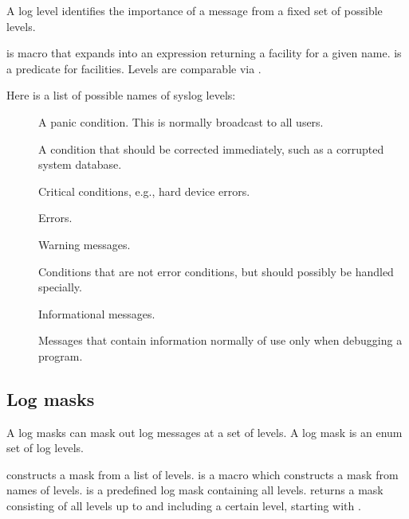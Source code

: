 A log level identifies the importance of a message from a fixed set
of possible levels.

\begin{protos}
\end{protos}
\noindent
{} is macro that expands into an expression returning
a facility for a given name.   is a predicate for
facilities.  Levels are comparable via .

Here is a list of possible names of syslog levels:

\begin{description}
\item[]
  A panic condition.  This is normally broadcast to all users.

\item[]
  A condition that should be corrected immediately, such as a
  corrupted system database.

\item[]
  Critical conditions, e.g., hard device errors.

\item[]
  Errors.

\item[]
  Warning messages.

\item[]
  Conditions that are not error conditions, but should possibly be
  handled specially.

\item[]
  Informational messages.

\item[]
  Messages that contain information normally of use only when
  debugging a program.
\end{description}

\subsection*{Log masks}

A log masks can mask out log messages at a set of levels.  A log
mask is an enum set of log levels.

\begin{protos}
\end{protos}
\noindent
{} constructs a mask from a list of levels.
 is a macro which constructs a mask from names of
levels.   is a predefined log mask containing
all levels.   returns a mask consisting of all
levels up to and including a certain level, starting with
.

